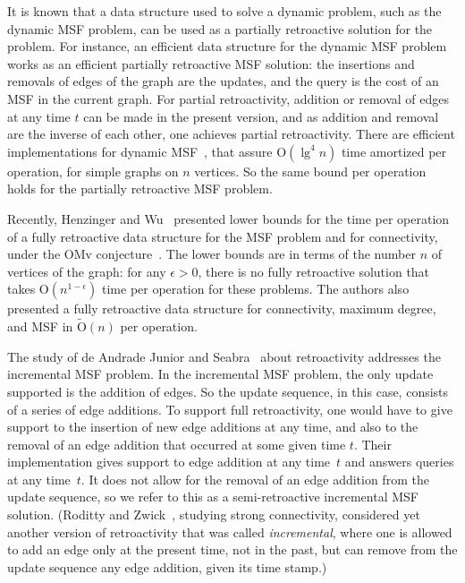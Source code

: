 \documentclass[3p,times,procedia]{elsarticle}
\newcommand{\eps}{\epsilon}
\newcommand{\Oh}{\mathrm{O}}
\begin{document}
It is known that a data structure used to solve a dynamic problem, such as the 
dynamic MSF problem, can be used as a partially retroactive solution for the problem.  
For instance, an efficient data structure for the dynamic MSF problem works as an 
efficient partially retroactive MSF solution: the insertions and removals of edges 
of the graph are the updates, and the query is the cost of an MSF in the current graph.  
For partial retroactivity, addition or removal of edges at any time $t$ can be made 
in the present version, and as addition and removal are the inverse of each other, 
one achieves partial retroactivity.  
There are efficient implementations for dynamic MSF~\cite{HolmLT2001,HolmRWN2015}, 
that assure $\Oh(\lg^4 n)$ time amortized per operation, for simple graphs on $n$ vertices. 
So the same bound per operation holds for the partially retroactive MSF problem. 

Recently, Henzinger and Wu~\cite{HenzingerW2021} presented lower bounds for the 
time per operation of a fully retroactive data structure for the MSF problem and 
for connectivity, under the OMv conjecture~\cite{HenzingerKNS2015}.  The lower 
bounds are in terms of the number $n$ of vertices of the graph: for any $\eps>0$,
there is no fully retroactive solution that takes $\Oh(n^{1-\eps})$ time per 
operation for these problems.  The authors also presented a fully retroactive
data structure for connectivity, maximum degree, and MSF in $\tilde{\Oh}(n)$ 
per operation.  

The study of de Andrade Junior and Seabra~\cite{deAndradeJrS2022} about retroactivity 
addresses the incremental MSF problem.  In the incremental MSF problem, the only update
supported is the addition of edges.  So the update sequence, in this case, consists 
of a series of edge additions.  To support full retroactivity, one would have to give 
support to the insertion of new edge additions at any time, and also to the removal 
of an edge addition that occurred at some given time $t$.  Their implementation 
gives support to edge addition at any time~$t$ and answers queries at any time~$t$.  
It does not allow for the removal of an edge addition from the update sequence, 
so we refer to this as a semi-retroactive incremental MSF solution.
(Roditty and Zwick~\cite{RodittyZ2016}, studying strong connectivity, considered
yet another version of retroactivity that was called \emph{incremental}, 
where one is allowed to add an edge only at the present time, not in the past, 
but can remove from the update sequence any edge addition, given its time stamp.) 
\end{document}
